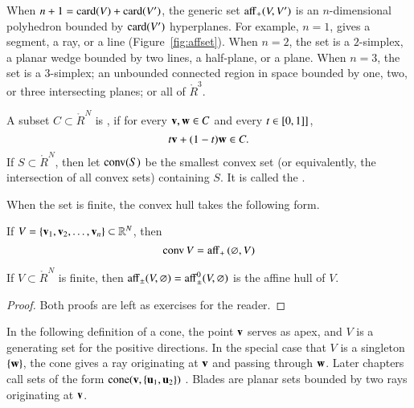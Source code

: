 \figITGCYIF %

\begin{remark}
  When $n+1={\operatorname{card}}(V)+{\operatorname{card}}(V')$, the generic set ${\operatorname{aff}}_+(V,V')$ is
  an $n$-dimensional polyhedron bounded by ${\operatorname{card}}(V')$ hyperplanes.
  For example, $n=1$, gives a segment, a ray, or a line
  (Figure~\ref{fig:affset}).  When $n=2$, the set is a $2$-simplex, a
  planar wedge bounded by two lines, a half-plane, or a plane.  When
  $n=3$, the set is a $3$-simplex; an unbounded connected region in
  space bounded by one, two, or three intersecting planes; or all of
  $\ring{R}^3$.
\end{remark}

\begin{definition}
A subset $C\subset\ring{R}^N$ is , if for
every ${\mathbf v},{\mathbf w}\in C$ and every $t \in [0,1]]$,
\[ 
t {\mathbf v} + (1-t) {\mathbf w} \in C.
\] 
If $S\subset\ring{R}^N$, then let ${\operatorname{conv}}(S)$ be the smallest convex set
(or equivalently, the intersection of all convex sets)
containing $S$.  It is called the .
\end{definition}

When the set is finite, the convex hull takes the following form.

\begin{lemma}[]
If $V = \{{\mathbf v}_1,{\mathbf v}_2,\ldots,{\mathbf v}_n\}\subset\mathbb{R}^N$, then
	\[ 
{\operatorname{conv}}\, V = {\operatorname{aff}}_+\, (\varnothing,V)
\] 
%
%
\end{lemma}

\begin{lemma}[]
If $V\subset\ring{R}^N$ is finite, then
${\operatorname{aff}}_\pm (V,\varnothing) = {\operatorname{aff}}^0_\pm(V,\varnothing)$
is the affine hull of $V$.
\end{lemma}

\begin{proof}  Both proofs are left as  exercises for the reader.
\end{proof}

In the following definition of a cone, the point ${\mathbf v}$ serves as apex,
and $V$ is a generating set for the positive directions.  In the
special case that $V$ is a singleton $\{{\mathbf w}\}$, the cone gives a ray
originating at ${\mathbf v}$ and passing through ${\mathbf w}$.  Later chapters call
sets of the form ${\operatorname{cone}}({\mathbf v},\{{\mathbf u}_1,{\mathbf u}_2\})$ .
Blades are planar sets bounded by two rays originating at ${\mathbf v}$.
%
%
%


